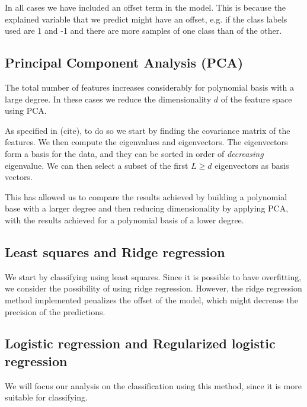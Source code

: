 \documentclass[10pt,conference,compsocconf]{IEEEtran}
\begin{document}
  In all cases we have included an offset term in the model. This is because the explained variable that we predict might have an offset, e.g. if the class labels used are 1 and -1 and there are more samples of one class than of the other.

\subsection{Principal Component Analysis (PCA)} %
\label{sub:principal_component_analysis}
  The total number of features increases considerably for polynomial basis with a large degree. In these cases we reduce the dimensionality $d$ of the feature space using PCA.

  As specified in (cite), to do so we start by finding the covariance matrix of the features. We then compute the eigenvalues and eigenvectors. The eigenvectors form a basis for the data, and they can be sorted in order of \emph{decreasing} eigenvalue. We can then select a subset of the first $L\geq d$ eigenvectors as basis vectors.

  This has allowed us to compare the results achieved by building a polynomial base with a larger degree and then reducing dimensionality by applying PCA, with the results achieved for a polynomial basis of a lower degree.

\subsection{Least squares and Ridge regression} %
\label{sub:least_squares_and_ridge_regression}
  We start by classifying using least squares. Since it is possible to have overfitting, we consider the possibility of using ridge regression. However, the ridge regression method implemented penalizes the offset of the model, which might decrease the precision of the predictions.


\subsection{Logistic regression and Regularized logistic regression} %
\label{sub:logistic_regression_and_regularized_logistic_regression}
  We will focus our analysis on the classification using this method, since it is more suitable for classifying.
\end{document}
